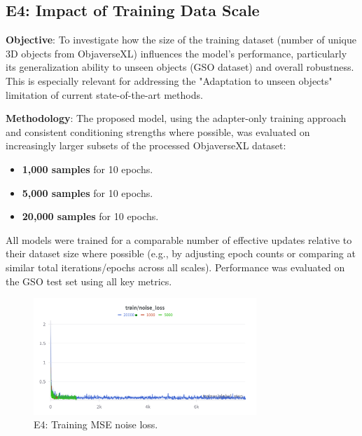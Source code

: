 \subsection{E4: Impact of Training Data Scale}\label{ssec:exp_data_scale}
\textbf{Objective}: To investigate how the size of the training dataset (number of unique 3D objects from ObjaverseXL) influences the model's performance, particularly its generalization ability to unseen objects (GSO dataset) and overall robustness. This is especially relevant for addressing the "Adaptation to unseen objects" limitation of current state-of-the-art methods.

\textbf{Methodology}:
The proposed model, using the adapter-only training approach and consistent conditioning strengths where possible, was evaluated on increasingly larger subsets of the processed ObjaverseXL dataset:
\begin{itemize}
  \item \textbf{1,000 samples} for 10 epochs.
  \item \textbf{5,000 samples} for 10 epochs.
  \item \textbf{20,000 samples} for 10 epochs.
\end{itemize}
All models were trained for a comparable number of effective updates relative to their dataset size where possible (e.g., by adjusting epoch counts or comparing at similar total iterations/epochs across all scales). Performance was evaluated on the GSO test set using all key metrics.

\begin{figure}[htbp]
  \centering
  \includegraphics[width=0.75\textwidth]{images/experiments/data_scale/train_loss.png}
  \caption{E4: Training MSE noise loss.}
  \label{fig:exp_data_scale_train_loss}
\end{figure}

